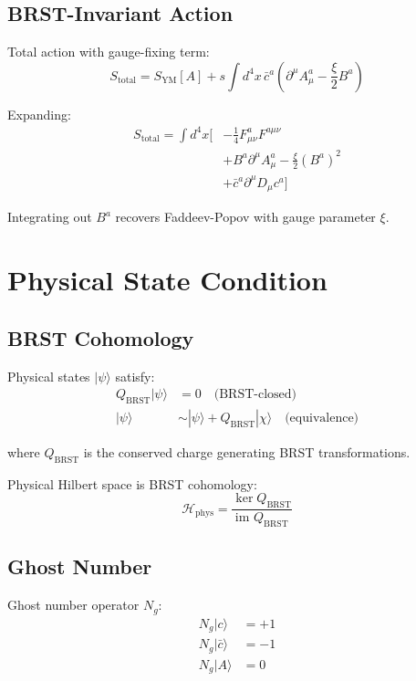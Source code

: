 \subsection{BRST-Invariant Action}

Total action with gauge-fixing term:
\begin{equation}
S_{\text{total}} = S_{\text{YM}}[A] + s \int d^4x \, \bar{c}^a \left( \partial^\mu A_\mu^a - \frac{\xi}{2} B^a \right)
\end{equation}

Expanding:
\begin{align}
S_{\text{total}} = \int d^4x \Bigg[& -\frac{1}{4} F_{\mu\nu}^a F^{a\mu\nu} \\
&+ B^a \partial^\mu A_\mu^a - \frac{\xi}{2} (B^a)^2 \\
&+ \bar{c}^a \partial^\mu D_\mu c^a \Bigg]
\end{align}

Integrating out $B^a$ recovers Faddeev-Popov with gauge parameter $\xi$.

\section{Physical State Condition}

\subsection{BRST Cohomology}

Physical states $|\psi\rangle$ satisfy:
\begin{align}
Q_{\text{BRST}} |\psi\rangle &= 0 \quad \text{(BRST-closed)} \\
|\psi\rangle &\sim |\psi\rangle + Q_{\text{BRST}} |\chi\rangle \quad \text{(equivalence)}
\end{align}

where $Q_{\text{BRST}}$ is the conserved charge generating BRST transformations.

Physical Hilbert space is BRST cohomology:
\begin{equation}
\mathcal{H}_{\text{phys}} = \frac{\ker Q_{\text{BRST}}}{\text{im }Q_{\text{BRST}}}
\end{equation}

\subsection{Ghost Number}

Ghost number operator $N_g$:
\begin{align}
N_g |c\rangle &= +1 \\
N_g |\bar{c}\rangle &= -1 \\
N_g |A\rangle &= 0
\end{align}

